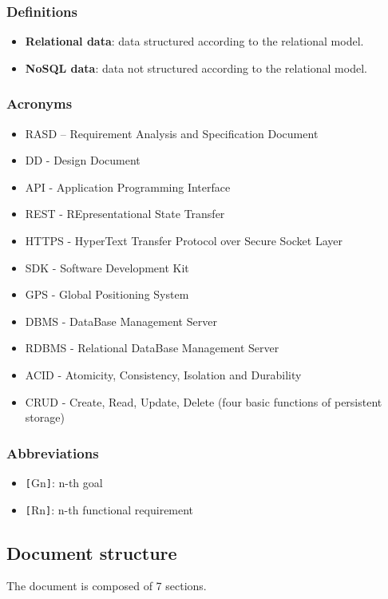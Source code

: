 \subsubsection{Definitions}
\begin{itemize}
\item \textbf{Relational data}: data structured according to the relational model.
\item \textbf{NoSQL data}: data not structured according to the relational model.
\end{itemize}
\subsubsection{Acronyms}
\begin{itemize}
\item RASD – Requirement Analysis and Specification Document
\item DD - Design Document
\item API - Application Programming Interface
\item REST - REpresentational State Transfer
\item HTTPS - HyperText Transfer Protocol over Secure Socket Layer
\item SDK - Software Development Kit
\item GPS - Global Positioning System
\item DBMS - DataBase Management Server
\item RDBMS - Relational DataBase Management Server
\item ACID - Atomicity, Consistency, Isolation and Durability
\item CRUD - Create, Read, Update, Delete (four basic functions of persistent storage)
\end{itemize}
\subsubsection{Abbreviations}
\begin{itemize}
\item \verb|[|Gn\verb|]|: n-th goal
\item \verb|[|Rn\verb|]|: n-th functional requirement
\end{itemize}

\subsection{Document structure}
The document is composed of 7 sections.\newline

